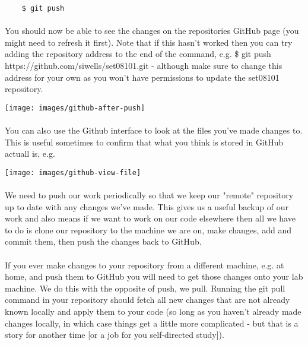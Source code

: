 \documentclass[10pt, a4paper]{article}
\begin{document}
\begin{lstlisting}
    $ git push
\end{lstlisting}

\paragraph{} You should now be able to see the changes on the repositories GitHub page (you might need to refresh it first). Note that if this hasn't worked then you can try adding the repository address to the end of the command, e.g. \$ git push https://github.com/siwells/set08101.git - although make sure to change this address for your own as you won't have permissions to update the set08101 repository.

\texttt{[image: images/github-after-push]}

\paragraph{} You can also use the Github interface to look at the files you've made changes to. This is useful sometimes to confirm that what you think is stored in GitHub actuall is, e.g.

\texttt{[image: images/github-view-file]}

\paragraph{} We need to push our work periodically so that we keep our "remote" repository up to date with any changes we've made. This gives us a useful backup of our work and also means if we want to work on our code elsewhere then all we have to do is clone our repository to the machine we are on, make changes, add and commit them, then push the changes back to GitHub.

\paragraph{} If you ever make changes to your repository from a different machine, e.g. at home, and push them to GitHub you will need to get those changes onto your lab machine. We do this with the opposite of push, we pull. Running the git pull command in your repository should fetch all new changes that are not already known locally and apply them to your code (so long as you haven't already made changes locally, in which case things get a little more complicated - but that is a story for another time [or a job for you self-directed study]).
\end{document}
